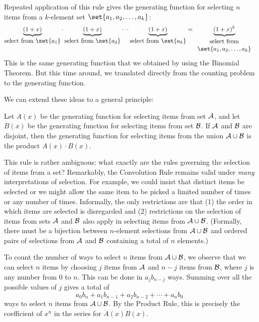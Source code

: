 Repeated application of this rule gives the generating function for
selecting $n$ items from a $k$-element set $\set{a_1, a_2, \dots,
a_k}$:
%
\[
\underbrace{(1 + x)}_{\textstyle\text{select from $\set{a_1}$}}
\cdot
\underbrace{(1 + x)}_{\textstyle\text{select from $\set{a_2}$}}
\cdots
\underbrace{(1 + x)}_{\textstyle\text{select from $\set{a_k}$}}
=
\underbrace{(1 + x)^k}_{
\begin{array}{cc}
\text{select from} \\
\set{a_1, a_2, \dots, a_k}
\end{array}}
\]
%
This is the same generating function that we obtained by using the
Binomial Theorem.  But this time around, we translated directly from
the counting problem to the generating function.

We can extend these ideas to a general principle:


\begin{rul}
Let $A(x)$ be the generating function for selecting items from set
${\cal A}$, and let $B(x)$ be the generating function for selecting
items from set ${\cal B}$.  If ${\cal A}$ and ${\cal B}$ are disjoint,
then the generating function for selecting items from the union ${\cal
A} \cup {\cal B}$ is the product $A(x) \cdot B(x)$.
\end{rul}

This rule is rather ambiguous: what exactly are the rules governing
the selection of items from a set?  Remarkably, the Convolution Rule
remains valid under \emph{many} interpretations of selection.  For
example, we could insist that distinct items be selected or we might
allow the same item to be picked a limited number of times or any
number of times.  Informally, the only restrictions are that (1) the
order in which items are selected is disregarded and (2) restrictions
on the selection of items from sets ${\cal A}$ and ${\cal B}$ also
apply in selecting items from ${\cal A} \cup {\cal B}$.  (Formally,
there must be a bijection between $n$-element selections from ${\cal
A} \cup {\cal B}$ and ordered pairs of selections from ${\cal A}$ and
${\cal B}$ containing a total of $n$ elements.)

To count the number of ways to select $n$ items from ${\cal A} \cup {\cal
B}$, we observe that we can select $n$ items by choosing $j$ items from
${\cal A}$ and $n - j$ items from ${\cal B}$, where $j$ is any number from
0 to $n$.  This can be done in $a_j b_{n-j}$ ways.  Summing over all the
possible values of $j$ gives a total of
\[
a_0 b_n + a_1 b_{n-1} + a_2 b_{n-2} + \cdots + a_n b_0
\]
ways to select $n$ items from ${\cal A} \cup {\cal B}$.  By the Product
Rule, this is precisely the coefficient of $x^n$ in the series for
$A(x)B(x)$.


